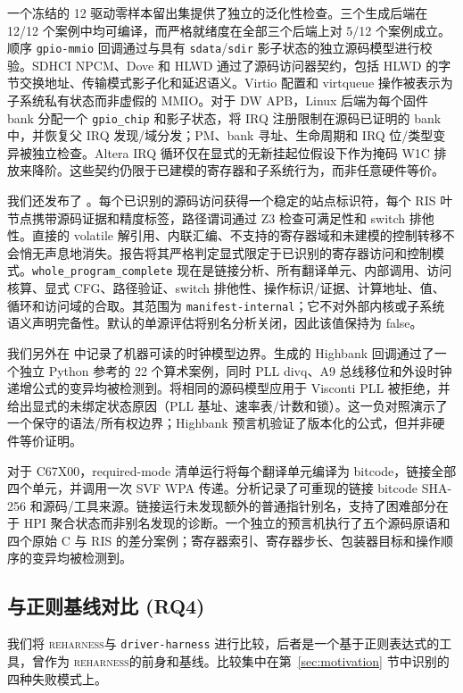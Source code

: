 \documentclass[sigplan, screen, review, anonymous]{acmart}
\newcommand{\reharness}{\textsc{reharness}}
\begin{document}
一个冻结的 12 驱动零样本留出集提供了独立的泛化性检查。三个生成后端在 12/12 个案例中均可编译，而严格就绪度在全部三个后端上对 5/12 个案例成立。顺序 \texttt{gpio-mmio} 回调通过与具有 \texttt{sdata}/\texttt{sdir} 影子状态的独立源码模型进行校验。SDHCI NPCM、Dove 和 HLWD 通过了源码访问器契约，包括 HLWD 的字节交换地址、传输模式影子化和延迟语义。Virtio 配置和 virtqueue 操作被表示为子系统私有状态而非虚假的 MMIO。对于 DW APB，Linux 后端为每个固件 bank 分配一个 \texttt{gpio\_chip} 和影子状态，将 IRQ 注册限制在源码已证明的 bank 中，并恢复父 IRQ 发现/域分发；PM、bank 寻址、生命周期和 IRQ 位/类型变异被独立检查。Altera IRQ 循环仅在显式的无新挂起位假设下作为掩码 W1C 排放来降阶。这些契约仍限于已建模的寄存器和子系统行为，而非任意硬件等价。

我们还发布了 。每个已识别的源码访问获得一个稳定的站点标识符，每个 RIS 叶节点携带源码证据和精度标签，路径谓词通过 Z3 检查可满足性和 switch 排他性。直接的 volatile 解引用、内联汇编、不支持的寄存器域和未建模的控制转移不会悄无声息地消失。报告将其严格判定显式限定于已识别的寄存器访问和控制模式。\texttt{whole\_program\_complete} 现在是链接分析、所有翻译单元、内部调用、访问核算、显式 CFG、路径验证、switch 排他性、操作标识/证据、计算地址、值、循环和访问域的合取。其范围为 \texttt{manifest-internal}；它不对外部内核或子系统语义声明完备性。默认的单源评估将别名分析关闭，因此该值保持为 false。

我们另外在  中记录了机器可读的时钟模型边界。生成的 Highbank 回调通过了一个独立 Python 参考的 22 个算术案例，同时 PLL divq、A9 总线移位和外设时钟递增公式的变异均被检测到。将相同的源码模型应用于 Visconti PLL 被拒绝，并给出显式的未绑定状态原因（PLL 基址、速率表/计数和锁）。这一负对照演示了一个保守的语法/所有权边界；Highbank 预言机验证了版本化的公式，但并非硬件等价证明。

对于 C67X00，required-mode 清单运行将每个翻译单元编译为 bitcode，链接全部四个单元，并调用一次 SVF WPA 传递。分析记录了可重现的链接 bitcode SHA-256 和源码/工具来源。链接运行未发现额外的普通指针别名，支持了困难部分在于 HPI 聚合状态而非别名发现的诊断。一个独立的预言机执行了五个源码原语和四个原始 C 与 RIS 的差分案例；寄存器索引、寄存器步长、包装器目标和操作顺序的变异均被检测到。

\subsection{与正则基线对比 (RQ4)}

我们将 \reharness 与 \texttt{driver-harness} 进行比较，后者是一个基于正则表达式的工具，曾作为 \reharness 的前身和基线。比较集中在第~\ref{sec:motivation} 节中识别的四种失败模式上。
\end{document}
